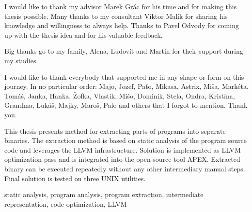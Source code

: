 \documentclass[12pt, twoside]{fithesis2}
\renewcommand{\_}{\leavevmode \kern0.07em\vbox{\hrule width0.4em}}
\begin{document}
\FrontMatter
\ThesisTitlePage






\begin{ThesisDeclaration}
    \DeclarationText
    \AdvisorName
\end{ThesisDeclaration}

\begin{ThesisThanks}
I would like to thank my advisor Marek Grác for his time and for making this
thesis possible.
Many thanks to my consultant Viktor Malík for sharing his knowledge and
willingness to always help.
Thanks to Pavel Odvody for coming up with the thesis idea and for his
valuable feedback.

Big thanks go to my family, Alena, Ľudovít and Martin for their support
during my studies.

I would like to thank everybody that supported me in any shape or form on this
journey. In no particular order: Majo, Jozef, Paťo, Mikasa, Astrix,
Miša, Markéta, Tomáš, Janka, Hanka, Žofka, Vlastík, Mišo, Dominik, Stela, Ondra,
Kristína, Grandma, Lukáš, Majky, Maroš, Palo and others that I forgot to
mention. Thank you.
\end{ThesisThanks}

\begin{ThesisAbstract}
This thesis presents method for extracting parts of programs into separate
binaries.
The extraction method is based on static analysis of the program source code
and leverages the LLVM infrastructure.
Solution is implemented as LLVM optimization pass and is integrated into the
open-source tool APEX.
Extracted binary can be executed repeatedly without any other intermediary
manual steps.
Final solution is tested on three UNIX utilities.

\end{ThesisAbstract}

\begin{ThesisKeyWords}
static analysis, program analysis, program extraction, intermediate
representation, code optimization, LLVM
\end{ThesisKeyWords}
\end{document}
